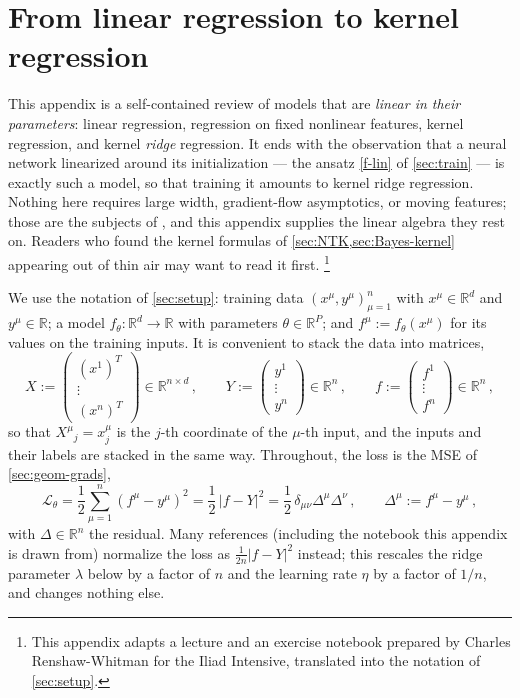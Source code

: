 \documentclass[11pt]{article}
\newcommand{\R}{\mathbb{R}}
\newcommand{\CL}{{\mathcal L}}
\begin{document}
\section{From linear regression to kernel regression}
\label{app:kernels}

This appendix is a self-contained review of models that are \emph{linear in their parameters}: linear regression, regression on fixed nonlinear features, kernel regression, and kernel \emph{ridge} regression. It ends with the observation that a neural network linearized around its initialization --- the ansatz \eqref{f-lin} of \cref{sec:train} --- is exactly such a model, so that training it amounts to kernel ridge regression. Nothing here requires large width, gradient-flow asymptotics, or moving features; those are the subjects of , and this appendix supplies the linear algebra they rest on. Readers who found the kernel formulas of \cref{sec:NTK,sec:Bayes-kernel} appearing out of thin air may want to read it first.%
\footnote{This appendix adapts a lecture and an exercise notebook prepared by Charles Renshaw-Whitman for the Iliad Intensive, translated into the notation of \cref{sec:setup}.}

We use the notation of \cref{sec:setup}: training data $(x^\mu,y^\mu)_{\mu=1}^n$ with $x^\mu\in \R^d$ and $y^\mu\in\R$; a model $f_\theta:\R^d\to \R$ with parameters $\theta\in \R^P$; and $f^\mu := f_\theta(x^\mu)$ for its values on the training inputs. It is convenient to stack the data into matrices,
%
\begin{equation}
    X := \begin{pmatrix} (x^1)^T \\ \vdots \\ (x^n)^T \end{pmatrix} \in \R^{n\times d}\,,\qquad
    Y := \begin{pmatrix} y^1 \\ \vdots \\ y^n \end{pmatrix} \in \R^{n}\,,\qquad
    f := \begin{pmatrix} f^1 \\ \vdots \\ f^n \end{pmatrix} \in \R^{n}\,, \label{app-stack}
\end{equation}
%
so that $X^\mu{}_j = x^\mu_j$ is the $j$-th coordinate of the $\mu$-th input, and the inputs and their labels are stacked in the same way. Throughout, the loss is the MSE of \cref{sec:geom-grads},
%
\begin{equation}
    \CL_\theta = \frac{1}{2}\sum_{\mu=1}^n (f^\mu-y^\mu)^2 = \frac{1}{2}\,|f-Y|^2 = \frac{1}{2}\,\delta_{\mu\nu}\Delta^\mu\Delta^\nu\,,\qquad \Delta^\mu := f^\mu - y^\mu\,, \label{app-loss}
\end{equation}
%
with $\Delta\in\R^n$ the residual. Many references (including the notebook this appendix is drawn from) normalize the loss as $\frac{1}{2n}|f-Y|^2$ instead; this rescales the ridge parameter $\lambda$ below by a factor of $n$ and the learning rate $\eta$ by a factor of $1/n$, and changes nothing else.
\end{document}
